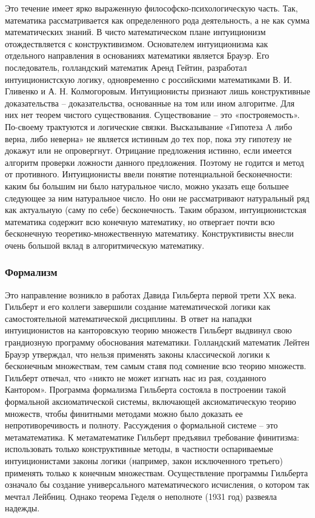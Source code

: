 Это течение имеет ярко выраженную философско-психологическую часть. Так, математика рассматривается как определенного рода деятельность, а не как сумма математических знаний. В чисто математическом плане интуиционизм отождествляется с конструктивизмом. Основателем интуиционизма как отдельного направления в основаниях математики является Брауэр. Его последователь, голландский математик Аренд Гейтин, разработал интуиционистскую логику, одновременно с российскими математиками В. И. Гливенко и А. Н. Колмогоровым. Интуиционисты признают лишь конструктивные доказательства – доказательства, основанные на том или ином алгоритме. Для них нет теорем чистого существования. Существование – это «построяемость». По-своему трактуются и логические связки. Высказывание «Гипотеза A либо верна, либо неверна» не является истинным до тех пор, пока эту гипотезу не докажут или не опровергнут. Отрицание предложения истинно, если имеется алгоритм проверки ложности данного предложения. Поэтому не годится и метод от противного. Интуиционисты ввели понятие потенциальной бесконечности: каким бы большим ни было натуральное число, можно указать еще большее следующее за ним натуральное число. Но они не рассматривают натуральный ряд как актуальную (саму по себе) бесконечность. Таким образом, интуиционистская математика содержит всю конечную математику, но отвергает почти всю бесконечную теоретико-множественную математику. Конструктивисты внесли очень большой вклад в алгоритмическую математику. 

\subsubsection{Формализм}

Это направление возникло в работах Давида Гильберта первой трети XX века. Гильберт и его коллеги завершили создание математической логики как самостоятельной математической дисциплины. В ответ на нападки интуиционистов на канторовскую теорию множеств Гильберт выдвинул свою грандиозную программу обоснования математики. Голландский математик Лейтен Брауэр утверждал, что нельзя применять законы классической логики к бесконечным множествам, тем самым ставя под сомнение всю теорию множеств. Гильберт отвечал, что «никто не может изгнать нас из рая, созданного Кантором». Программа формализма Гильберта состояла в построении такой формальной аксиоматической системы, включающей аксиоматическую теорию множеств, чтобы финитными методами можно было доказать ее непротиворечивость и полноту. Рассуждения о формальной системе – это метаматематика. К метаматематике Гильберт предъявил требование финитизма: использовать только конструктивные методы, в частности оспариваемые интуиционистами законы логики (например, закон исключенного третьего) применять только к конечным множествам. Осуществление программы Гильберта означало бы создание универсального математического исчисления, о котором так мечтал Лейбниц. Однако теорема Геделя о неполноте (1931 год) развеяла надежды.

